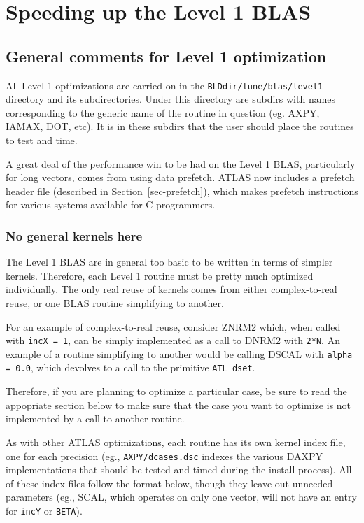 \documentclass[11pt]{article}
\begin{document}
\section{Speeding up the Level 1 BLAS}

\subsection{General comments for Level 1 optimization}
All Level 1 optimizations are carried on in the 
{\tt BLDdir/tune/blas/level1} directory and its subdirectories.  Under this
directory are subdirs with names corresponding to the generic name of the
routine in question (eg. AXPY, IAMAX, DOT, etc).  It is in these subdirs that
the user should place the routines to test and time.

A great deal of the performance win to be had on the Level 1 BLAS, 
particularly for long vectors, comes from using data prefetch.  
ATLAS now includes a prefetch header file (described in
Section~\ref{sec-prefetch}), which makes prefetch instructions for 
various systems available for C programmers.

\subsubsection{No general kernels here}
The Level 1 BLAS are in general too basic to be written in terms of simpler
kernels.  Therefore, each Level 1 routine must be pretty much optimized
individually.  The only real reuse of kernels comes from either
complex-to-real reuse, or one BLAS routine simplifying to another.

For an example of complex-to-real reuse, consider ZNRM2 which, when called with
{\tt incX = 1}, can be simply implemented as a call to DNRM2 with {\tt 2*N}.
An example of a routine simplifying to another would be calling DSCAL with
{\tt alpha = 0.0}, which devolves to a call to the primitive {\tt ATL\_dset}.

Therefore, if you are planning to optimize a particular case, be sure to read
the appopriate section below to make sure that the case you want to optimize
is not implemented by a call to another routine.

As with other ATLAS optimizations, each routine has its own kernel index file,
one for each precision (eg., {\tt AXPY/dcases.dsc} indexes the various DAXPY 
implementations that should be tested and timed during the install process).
All of these index files follow the format below, though they leave out
unneeded parameters (eg., SCAL, which operates on only one vector, will not
have an entry for {\tt incY} or {\tt BETA}).
\end{document}
